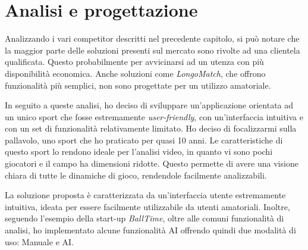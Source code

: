 \chapter{Analisi e progettazione}
\label{cha:analisi_progettazione}

Analizzando i vari competitor descritti nel precedente capitolo, si può notare che la maggior parte delle soluzioni presenti sul mercato sono rivolte ad una clientela qualificata. Questo probabilmente per avvicinarsi ad un utenza con più disponibilità economica.
Anche soluzioni come \textit{LongoMatch}, che offrono funzionalità più semplici, non sono progettate per un utilizzo amatoriale.

In seguito a queste analisi, ho deciso di sviluppare un'applicazione orientata ad un unico sport che fosse estremamente \textit{user-friendly}, con un'interfaccia intuitiva e con un set di funzionalità relativamente limitato. Ho deciso di focalizzarmi sulla pallavolo, uno sport che ho praticato per quasi 10 anni. Le caratteristiche di questo sport lo rendono ideale per l'analisi video, in quanto vi sono pochi giocatori e il campo ha dimensioni ridotte. Questo permette di avere una visione chiara di tutte le dinamiche di gioco, rendendole facilmente analizzabili.

La soluzione proposta è caratterizzata da un'interfaccia utente estremamente intuitiva, ideata per essere facilmente utilizzabile da utenti amatoriali. Inoltre, seguendo l'esempio della start-up \textit{BallTime}, oltre alle comuni funzionalità di analisi, ho implementato alcune funzionalità AI offrendo quindi due modalità di uso: Manuale e AI.

